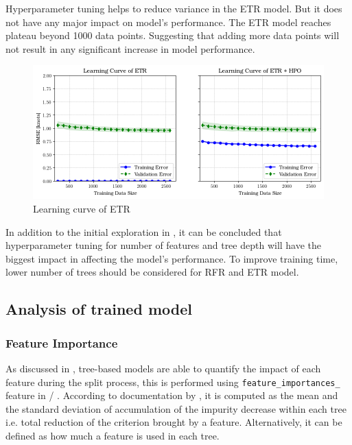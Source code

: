 Hyperparameter tuning helps to reduce variance in the ETR model. But it does not have any major impact on model's performance. The ETR model reaches plateau beyond 1000 data points. Suggesting that adding more data points will not result in any significant increase in model performance.\\

\begin{figure}[h]
    \centering
        \includegraphics[width=.95\textwidth]{02_figures/learning_curve_etr_rmse.png}
        \caption{Learning curve of ETR}
        \label{fig:learn_curve_ETR_RMSE}
\end{figure}

In addition to the initial exploration in , it can be concluded that hyperparameter tuning for number of features and tree depth will have the biggest impact in affecting the model's performance. To improve training time, lower number of trees should be considered for RFR and ETR model.\\


\subsection*{Analysis of trained model}\label{sec:BBM_model_eval}

\subsubsection*{Feature Importance}

As discussed in , tree-based models are able to quantify the impact of each feature during the split process, this is performed using {\tt feature\_importances\_} feature in \scikit/ . According to documentation by , it is computed as the mean and the standard deviation of accumulation of the impurity decrease within each tree i.e. total reduction of the criterion brought by a feature. Alternatively, it can be defined as how much a feature is used in each tree.\\


